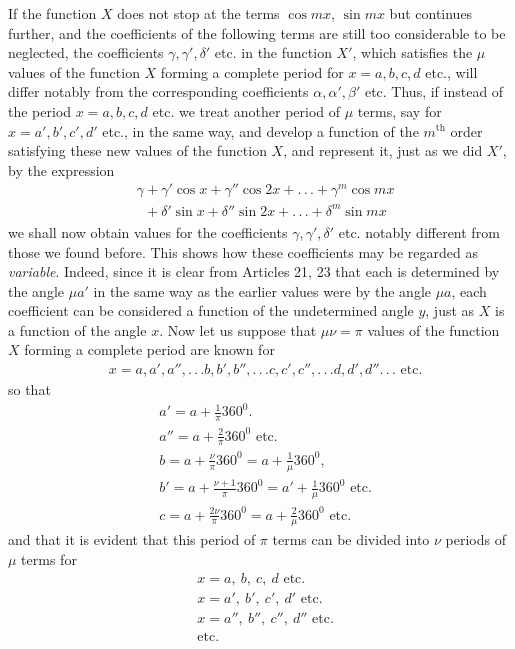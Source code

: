 \begingroup
\renewcommand{\arraystretch}{1.45}
If the function $X$ does not stop at the terms $\cos mx$, $\sin mx$ but continues further, and the coefficients of the following terms are still too considerable to be neglected, the coefficients $\gamma,\gamma',\delta'$ etc. in the function $X'$, which satisfies the $\mu$ values of the function $X$ forming a complete period for $x=a,b,c,d$ etc., will differ notably from the corresponding coefficients $\alpha,\alpha',\beta'$ etc. Thus, if instead of the period $x=a,b,c,d$ etc. we treat another period of $\mu$ terms, say for $x=a',b',c',d'$ etc., in the same way, and develop a function of the $m^{\mathrm{th}}$ order satisfying these new values of the function $X$, and represent it, just as we did $X'$, by the expression
\[
\begin{aligned}
&\gamma+\gamma'\cos x+\gamma''\cos2x+.\,.\,.+\gamma^m\cos mx\\[5pt]
&\phantom{\gamma}+\delta'\sin x+\delta''\sin2x+.\,.\,.+\delta^m\sin mx
\end{aligned}
\]
we shall now obtain values for the coefficients $\gamma,\gamma',\delta'$ etc. notably different from those we found before. This shows how these coefficients may be regarded as \textit{variable}. Indeed, since it is clear from Articles 21, 23 that each is determined by the angle $\mu a'$ in the same way as the earlier values were by the angle $\mu a$, each coefficient can be considered a function of the undetermined angle $y$, just as $X$ is a function of the angle $x$. 
Now let us suppose that $\mu\nu=\pi$ values of the function $X$ forming a complete period are known for
\[
\begin{aligned}
&x=a,a',a'',.\,.\,.b,b',b'',.\,.\,.c,c',c'',.\,.\,.d,d',d''.\,.\,.\text{ etc.}
\end{aligned}
\]
so that
\[
\begin{aligned}
&a'=a+\tfrac1\pi360^0.\\[5pt]
&a''=a+\tfrac2\pi360^0\text{ etc.}\\[5pt]
&b=a+\tfrac\nu\pi360^0=a+\tfrac1\mu360^0,\\[5pt]
&b'=a+\tfrac{\nu+1}\pi360^0=a'+\tfrac1\mu360^0\text{ etc.}\\[5pt]
&c=a+\tfrac{2\nu}\pi360^0=a+\tfrac2\mu360^0\text{ etc.}
\end{aligned}
\]
and that it is evident that this period of $\pi$ terms can be divided into $\nu$ periods of $\mu$ terms for
\[
\begin{aligned}
&x=a,\ b,\ c,\ d\text{ etc.}\\[5pt]
&x=a',\ b',\ c',\ d'\text{ etc.}\\[5pt]
&x=a'',\ b'',\ c'',\ d''\text{ etc.}\\[5pt]
&\text{etc.}
\end{aligned}
\]

